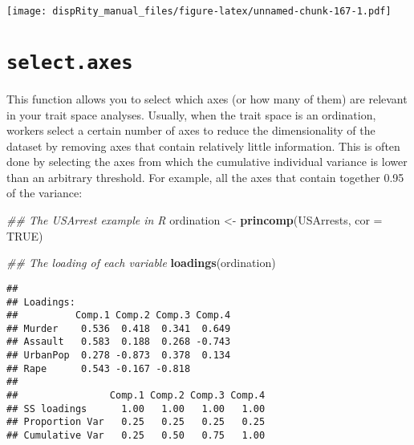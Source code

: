 \documentclass[
]{book}
\newenvironment{Shaded}{\begin{snugshade}}{\end{snugshade}}
\newcommand{\CommentTok}[1]{\textcolor[rgb]{0.56,0.35,0.01}{\textit{#1}}}
\newcommand{\DataTypeTok}[1]{\textcolor[rgb]{0.13,0.29,0.53}{#1}}
\newcommand{\DecValTok}[1]{\textcolor[rgb]{0.00,0.00,0.81}{#1}}
\newcommand{\KeywordTok}[1]{\textcolor[rgb]{0.13,0.29,0.53}{\textbf{#1}}}
\newcommand{\NormalTok}[1]{#1}
\newcommand{\OperatorTok}[1]{\textcolor[rgb]{0.81,0.36,0.00}{\textbf{#1}}}
\newcommand{\OtherTok}[1]{\textcolor[rgb]{0.56,0.35,0.01}{#1}}
\newcommand{\StringTok}[1]{\textcolor[rgb]{0.31,0.60,0.02}{#1}}
\begin{document}
\texttt{[image: dispRity\_manual\_files/figure-latex/unnamed-chunk-167-1.pdf]}

\hypertarget{select.axes}{%
\section{\texorpdfstring{\texttt{select.axes}}{select.axes}}\label{select.axes}}

This function allows you to select which axes (or how many of them) are relevant in your trait space analyses.
Usually, when the trait space is an ordination, workers select a certain number of axes to reduce the dimensionality of the dataset by removing axes that contain relatively little information.
This is often done by selecting the axes from which the cumulative individual variance is lower than an arbitrary threshold.
For example, all the axes that contain together 0.95 of the variance:

\begin{Shaded}
\begin{Highlighting}[]
\CommentTok{\#\# The USArrest example in R}
\NormalTok{ordination \textless{}{-}}\StringTok{ }\KeywordTok{princomp}\NormalTok{(USArrests, }\DataTypeTok{cor =} \OtherTok{TRUE}\NormalTok{)}

\CommentTok{\#\# The loading of each variable}
\KeywordTok{loadings}\NormalTok{(ordination)}
\end{Highlighting}
\end{Shaded}

\begin{verbatim}
## 
## Loadings:
##          Comp.1 Comp.2 Comp.3 Comp.4
## Murder    0.536  0.418  0.341  0.649
## Assault   0.583  0.188  0.268 -0.743
## UrbanPop  0.278 -0.873  0.378  0.134
## Rape      0.543 -0.167 -0.818       
## 
##                Comp.1 Comp.2 Comp.3 Comp.4
## SS loadings      1.00   1.00   1.00   1.00
## Proportion Var   0.25   0.25   0.25   0.25
## Cumulative Var   0.25   0.50   0.75   1.00
\end{verbatim}

\begin{Shaded}
\end{Shaded}
\end{document}

